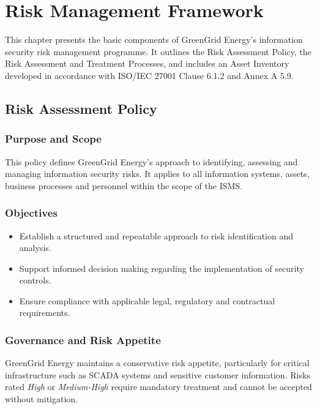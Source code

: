 \chapter{Risk Management Framework}
\label{chap:risk_management}

This chapter presents the basic components of GreenGrid Energy's information security risk management programme. It outlines the Risk Assessment Policy, the Risk Assessment and Treatment Processes, and includes an Asset Inventory developed in accordance with ISO/IEC 27001 Clause 6.1.2 and Annex A 5.9.

\section{Risk Assessment Policy}
\label{sec:risk_policy}

\subsection*{Purpose and Scope}
This policy defines GreenGrid Energy's approach to identifying, assessing and managing information security risks. It applies to all information systems, assets, business processes and personnel within the scope of the \ac{ISMS}.

\subsection*{Objectives}
\begin{itemize}
    \item Establish a structured and repeatable approach to risk identification and analysis.
    \item Support informed decision making regarding the implementation of security controls.
    \item Ensure compliance with applicable legal, regulatory and contractual requirements.
\end{itemize}

\subsection*{Governance and Risk Appetite}
\label{subsubsection:risk_apetite}

GreenGrid Energy maintains a conservative risk appetite, particularly for critical infrastructure such as \ac{SCADA} systems and sensitive customer information. Risks rated \textit{High} or \textit{Medium-High} require mandatory treatment and cannot be accepted without mitigation.

